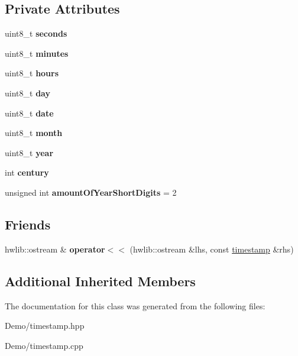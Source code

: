 \subsection*{Private Attributes}
\begin{DoxyCompactItemize}
\item 
\mbox{\label{classtimestamp_a15ad236c6963bfbd6ae18416697c91c2}} 
uint8\+\_\+t {\bfseries seconds}
\item 
\mbox{\label{classtimestamp_a45c06ef17b96bdd37cd168faf772c63c}} 
uint8\+\_\+t {\bfseries minutes}
\item 
\mbox{\label{classtimestamp_a3b2f11626563cca00d60b323ceb15191}} 
uint8\+\_\+t {\bfseries hours}
\item 
\mbox{\label{classtimestamp_a0102d6c44b2cc194a8186a42ff2bd58b}} 
uint8\+\_\+t {\bfseries day}
\item 
\mbox{\label{classtimestamp_a7eb2eee5f6ef4258aab7779a639a93fd}} 
uint8\+\_\+t {\bfseries date}
\item 
\mbox{\label{classtimestamp_a71df69b7ebb5a6dd228f4ae70b954505}} 
uint8\+\_\+t {\bfseries month}
\item 
\mbox{\label{classtimestamp_a6df342bdd1101cf67f9a4831d5372d58}} 
uint8\+\_\+t {\bfseries year}
\item 
\mbox{\label{classtimestamp_afe83888ffa38c1615a3d12b012f235b3}} 
int {\bfseries century}
\item 
\mbox{\label{classtimestamp_a609e9db2ee9245b5b007c384ca22b7b8}} 
unsigned int {\bfseries amount\+Of\+Year\+Short\+Digits} = 2
\end{DoxyCompactItemize}
\subsection*{Friends}
\begin{DoxyCompactItemize}
\item 
\mbox{\label{classtimestamp_a0625abe0748dbab228b73920dfc33c4c}} 
hwlib\+::ostream \& {\bfseries operator$<$$<$} (hwlib\+::ostream \&lhs, const \mbox{\hyperlink{classtimestamp}{timestamp}} \&rhs)
\end{DoxyCompactItemize}
\subsection*{Additional Inherited Members}


The documentation for this class was generated from the following files\+:\begin{DoxyCompactItemize}
\item 
Demo/timestamp.\+hpp\item 
Demo/timestamp.\+cpp\end{DoxyCompactItemize}
